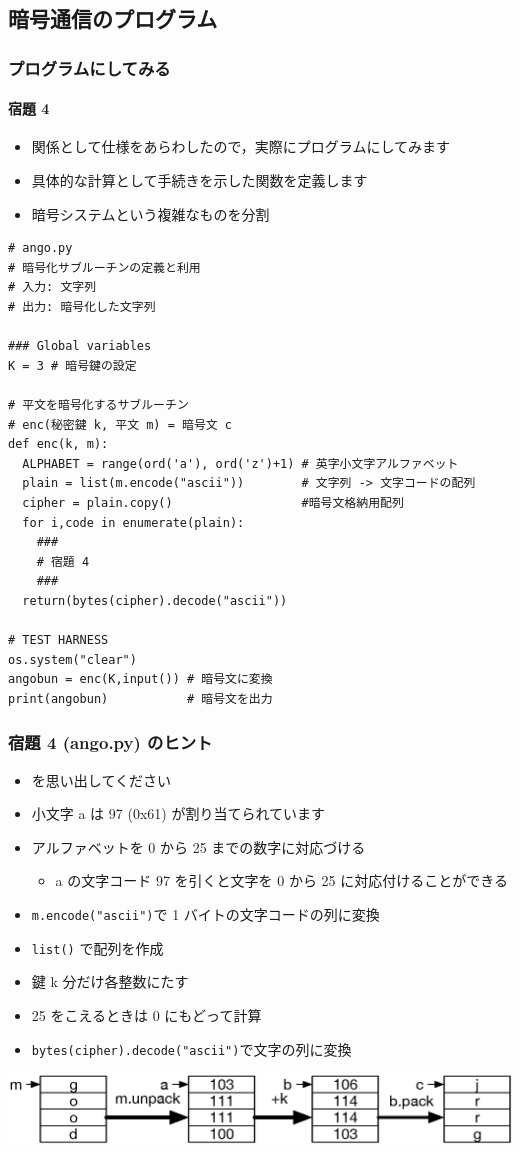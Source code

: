 \subsection{暗号通信のプログラム}
\begin{frame}
\frametitle{プログラムにしてみる}
\framesubtitle{宿題 4}
  \begin{itemize}
\item 関係として仕様をあらわしたので，実際にプログラムにしてみます
\item 具体的な計算として手続きを示した関数を定義します
\item 暗号システムという複雑なものを分割
  \end{itemize}
  \begin{lstlisting}[caption={ango.py},label=lst:ango]
# ango.py
# 暗号化サブルーチンの定義と利用
# 入力: 文字列
# 出力: 暗号化した文字列

### Global variables
K = 3 # 暗号鍵の設定

# 平文を暗号化するサブルーチン
# enc(秘密鍵 k, 平文 m) = 暗号文 c
def enc(k, m):
  ALPHABET = range(ord('a'), ord('z')+1) # 英字小文字アルファベット
  plain = list(m.encode("ascii"))        # 文字列 -> 文字コードの配列
  cipher = plain.copy()                  #暗号文格納用配列
  for i,code in enumerate(plain):
    ###
    # 宿題 4
    ###
  return(bytes(cipher).decode("ascii"))

# TEST HARNESS
os.system("clear")
angobun = enc(K,input()) # 暗号文に変換
print(angobun)           # 暗号文を出力
  \end{lstlisting}
\end{frame}
\begin{frame}
\frametitle{宿題 4 (ango.py) のヒント}
  \begin{itemize}
\item \href{https://en.wikipedia.org/wiki/ASCII\#/media/File:US-ASCII\_code\_chart.png}{} を思い出してください
\item 小文字 a は 97 (0x61) が割り当てられています
\item アルファベットを 0 から 25 までの数字に対応づける
    \begin{itemize}
\item a の文字コード 97 を引くと文字を 0 から 25 に対応付けることができる
    \end{itemize}
\item {\tt m.encode("ascii")}で 1 バイトの文字コードの列に変換
\item {\tt list()} で配列を作成
\item 鍵 k 分だけ各整数にたす
\item 25 をこえるときは 0 にもどって計算
\item {\tt bytes(cipher).decode("ascii")}で文字の列に変換
  \end{itemize}
  \begin{center}
\includegraphics[scale=0.5]{./Figure/elementaryCS-figAngo.eps}
  \end{center}
\end{frame}
